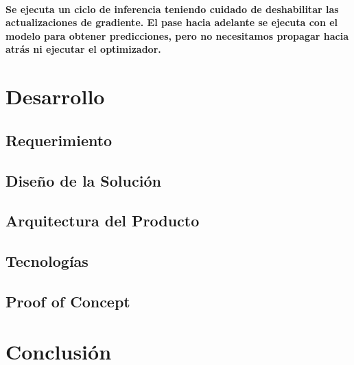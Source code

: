 \documentclass[12pt]{article}
\begin{document}
\paragraph{
Se ejecuta un ciclo de inferencia teniendo cuidado de deshabilitar las actualizaciones de gradiente. El pase hacia adelante se ejecuta con el modelo para obtener predicciones, pero no necesitamos propagar hacia atrás ni ejecutar el optimizador.
}
\section{Desarrollo}
\subsection{Requerimiento}
\subsection{Diseño de la Solución}
\subsection{Arquitectura del Producto}
\subsection{Tecnologías}
\subsection{Proof of Concept}
\section{Conclusión}
\end{document}
